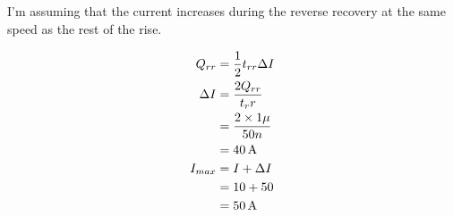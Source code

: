 \subsection{}


\begin{center}

\end{center}

I'm assuming that the current increases during the reverse recovery at the same speed as the rest of the rise.

\begin{align*}
Q_{rr}   & = \frac{1}{2} t_{rr} \Delta I \\
\Delta I & = \frac{2Q_{rr}}{t_rr} \\
         & = \frac{2 \times 1\mu}{50n} \\
         & = \unit[40]{A} \\
I_{max}  & = I + \Delta I \\
         & = 10 + 50 \\
         & = \unit[50]{A}
\end{align*}